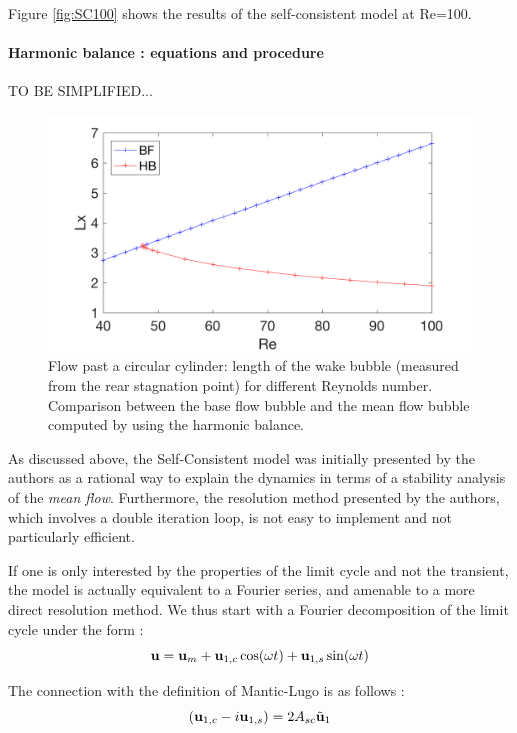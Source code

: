 \documentclass[twocolumn,10pt]{asme2ej}
\newcommand{\be}[1]{ \begin{equation} \label{#1}}
\newcommand{\ee}{\end{equation}}
\begin{document}
Figure \ref{fig:SC100} shows the results of the self-consistent model at Re=100.

\paragraph{Harmonic balance : equations and procedure }

TO BE SIMPLIFIED...

\begin{figure}
\begin{center}
\includegraphics[width=.9 \linewidth]{Cylinder_Lx_Re_HB.png}
\end{center}
\caption{Flow past a circular cylinder: length of the wake bubble (measured from the 
rear stagnation point) for different Reynolds number. Comparison between the base flow bubble and the mean flow bubble computed by using the harmonic balance.}
\label{fig:Comp1}
\end{figure}
As discussed above, the Self-Consistent model was initially presented by the authors as a rational way to explain the dynamics in terms of a stability analysis of the {\em mean flow}. Furthermore, the resolution method presented by the authors, which involves a double iteration loop, is not easy to implement and not particularly efficient.

If one is only interested by the properties of the limit cycle and not the transient, the model is actually equivalent to a Fourier series, and amenable to a more direct resolution method. 
We thus start with a Fourier decomposition of the limit cycle under the form :
\be{HB}
{\bf u } = {\bf u }_m + {\bf u }_{1,c} \cos( \omega t ) +   {\bf u }_{1,s} \sin( \omega t )
\ee  

The connection with the definition of Mantic-Lugo is as follows :
\be{HBtoSC}
\left( {\bf u }_{1,c} - i {\bf u }_{1,s} \right) = 2 A_{sc} \tilde{{\bf u }}_1
\ee  
\end{document}
